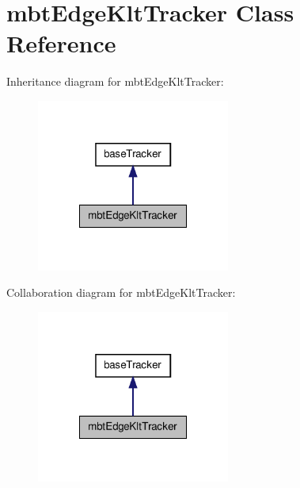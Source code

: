 \hypertarget{classmbtEdgeKltTracker}{\section{mbt\-Edge\-Klt\-Tracker \-Class \-Reference}
\label{classmbtEdgeKltTracker}
}


\-Inheritance diagram for mbt\-Edge\-Klt\-Tracker\-:
\nopagebreak
\begin{figure}[H]
\begin{center}
\leavevmode
\includegraphics[width=180pt]{classmbtEdgeKltTracker__inherit__graph}
\end{center}
\end{figure}


\-Collaboration diagram for mbt\-Edge\-Klt\-Tracker\-:
\nopagebreak
\begin{figure}[H]
\begin{center}
\leavevmode
\includegraphics[width=180pt]{classmbtEdgeKltTracker__coll__graph}
\end{center}
\end{figure}
